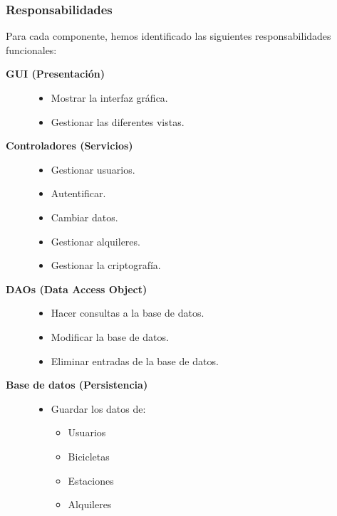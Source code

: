 \subsubsection{Responsabilidades}
Para cada componente, hemos identificado las siguientes responsabilidades funcionales:
\begin{description}
    \item[\textbf{GUI (Presentación)}]
    \begin{itemize}
        \item Mostrar la interfaz gráfica.
        \item Gestionar las diferentes vistas.
    \end{itemize}
    \item[\textbf{Controladores (Servicios)}]
    \begin{itemize}
        \item Gestionar usuarios.
        \item Autentificar.
        \item Cambiar datos.
        \item Gestionar alquileres.
        \item Gestionar la criptografía.
    \end{itemize}
    \item[\textbf{DAOs (Data Access Object)}]
    \begin{itemize}
        \item Hacer consultas a la base de datos.
        \item Modificar la base de datos.
        \item Eliminar entradas de la base de datos.
    \end{itemize}
    \item[\textbf{Base de datos (Persistencia)}]
    \begin{itemize}
        \item Guardar los datos de:
        \begin{itemize}
            \item Usuarios
            \item Bicicletas
            \item Estaciones
            \item Alquileres
        \end{itemize}
    \end{itemize}
\end{description}

